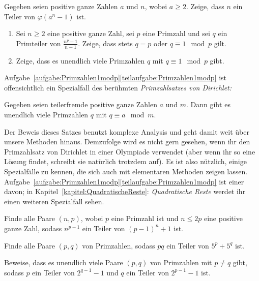 \begin{aufgabe*}\label{aufgabe:nTeiltPhi}
	Gegeben seien positive ganze Zahlen $a$ und $n$, wobei $a\geqslant 2$. Zeige, dass $n$ ein Teiler von $\varphi(a^n-1)$ ist.
\end{aufgabe*}
\begin{aufgabe*}\label{aufgabe:Primzahlen1modp}\leavevmode
	\begin{enumerate}[label={$(\alph*)$},ref={$(\alph*)$}]
		\item Sei $n\geqslant 2$ eine positive ganze Zahl, sei $p$ eine Primzahl und sei $q$ ein Primteiler von $\frac{n^p-1}{n-1}$. Zeige, dass stets $q=p$ oder $q\equiv 1\mod p$ gilt.\label{teilaufgabe:Trick17}
		\item Zeige, dass es unendlich viele Primzahlen $q$ mit $q\equiv 1\mod p$ gibt.\label{teilaufgabe:Primzahlen1modp}
	\end{enumerate}
\end{aufgabe*}
Aufgabe~\ref{aufgabe:Primzahlen1modp}\ref{teilaufgabe:Primzahlen1modp} ist offensichtlich ein Spezialfall des berühmten \emph{Primzahlsatzes von Dirichlet:}
\begin{satzmitnamen}
	Gegeben seien teilerfremde positive ganze Zahlen $a$ und $m$. Dann gibt es unendlich viele Primzahlen $q$ mit $q\equiv a\mod m$.
\end{satzmitnamen}
Der Beweis dieses Satzes benutzt komplexe Analysis und geht damit weit über unsere Methoden hinaus. Demzufolge wird es nicht gern gesehen, wenn ihr den Primzahlsatz von Dirichlet in einer Olympiade verwendet (aber wenn ihr so eine Lösung findet, schreibt sie natürlich trotzdem auf). Es ist also nützlich, einige Spezialfälle zu kennen, die sich auch mit elementaren Methoden zeigen lassen. Aufgabe~\ref{aufgabe:Primzahlen1modp}\ref{teilaufgabe:Primzahlen1modp} ist einer davon; in Kapitel~\ref{kapitel:QuadratischeReste}: \emph{Quadratische Reste} werdet ihr einen weiteren Spezialfall sehen.
\begin{aufgabe*}[*]\label{aufgabe:IMO1999}
	Finde alle Paare $(n,p)$, wobei $p$ eine Primzahl ist und $n\leqslant 2p$ eine positive ganze Zahl, sodass $n^{p-1}$ ein Teiler von $(p-1)^n+1$ ist.
\end{aufgabe*}
\begin{aufgabe*}[*]\label{aufgabe:5pq}
	Finde alle Paare $(p,q)$ von Primzahlen, sodass $pq$ ein Teiler von $5^p+5^q$ ist.
\end{aufgabe*}

\begin{aufgabe*}[**]\label{aufgabe:2HochpUnd2Hochq}
	Beweise, dass es unendlich viele Paare $(p,q)$ von Primzahlen mit $p\neq q$ gibt, sodass $p$ ein Teiler von $2^{q-1}-1$ und $q$ ein Teiler von $2^{p-1}-1$ ist.
\end{aufgabe*}

